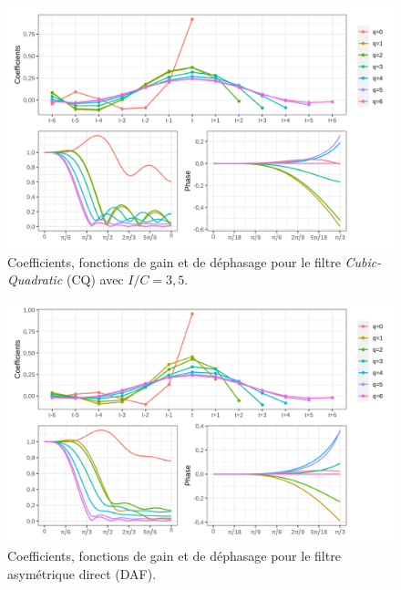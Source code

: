 \documentclass[
  12pt,
  a4paper,french]{article}
\newcommand\1{\mathds{1}}
\begin{document}
\begin{figure}[H]

{\centering \includegraphics[width=1\linewidth]{img/filters_used/cq} 

}

\caption[Coefficients, fonctions de gain et de déphasage pour le filtre \emph{Cubic-Quadratic} (CQ) avec \(I/C=3,5\)]{Coefficients, fonctions de gain et de déphasage pour le filtre \emph{Cubic-Quadratic} (CQ) avec \(I/C=3,5\).}\label{fig:graphscq}

\footnotesize
\normalsize\end{figure}

\begin{figure}[H]

{\centering \includegraphics[width=1\linewidth]{img/filters_used/daf} 

}

\caption[Coefficients, fonctions de gain et de déphasage pour le filtre asymétrique direct (DAF)]{Coefficients, fonctions de gain et de déphasage pour le filtre asymétrique direct (DAF).}\label{fig:graphsdaf}

\footnotesize
\normalsize\end{figure}
\end{document}
